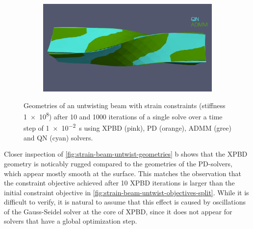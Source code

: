 \begin{figure}
\begin{subfigure}{0.49\textwidth}
    \end{subfigure}
    \hspace{0.001\textwidth}
    \begin{subfigure}{0.49\textwidth}
        \includegraphics[width=\textwidth, trim={0 4.5cm 0 2.15cm}, clip]{figures/strain_beam_untwist_QN_vs_ADMM_10_iterations.png}
    \end{subfigure}
    \caption{Geometries of an untwisting beam with strain constraints (stiffness \num{1e8}) after 10 and 1000 iterations of a single solve over a time step 
        of \SI{1e-2}{\second} using XPBD (pink), PD (orange), ADMM (gree) and QN (cyan) solvers.}
    \label{fig:strain-beam-untwist-geometries}
\end{figure}

Closer inspection of \autoref{fig:strain-beam-untwist-geometries} b shows that the XPBD geometry is noticably rugged compared to the geometries of the PD-solvers, which 
appear mostly smooth at the surface. This matches the observation that the constraint objective achieved after 10 XPBD iterations is larger than the initial constraint 
objective in \autoref{fig:strain-beam-untwist-objectives-split}. While it is difficult to verify, it is natural to assume that this effect is caused by oscillations 
of the Gauss-Seidel solver at the core of XPBD, since it does not appear for solvers that have a global optimization step. 

